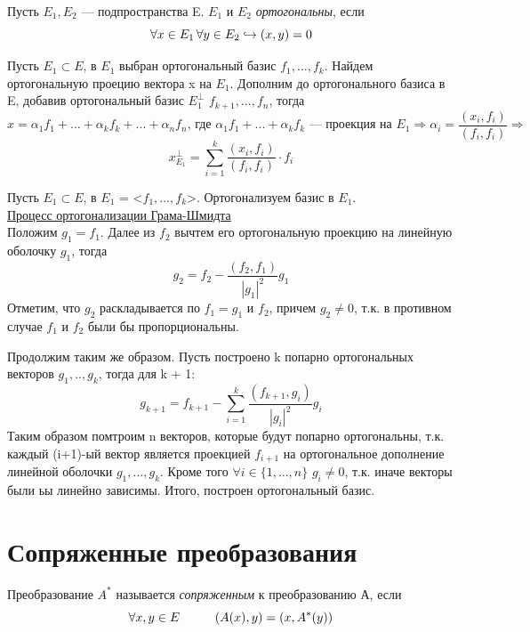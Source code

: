 \begin{definition}
    Пусть $E_1, E_2$ --- подпространства E. $E_1$ и $E_2$ \textit{ортогональны}, если 
    \[
    \forall x \in E_1\thinspace \forall y \in E_2 \hookrightarrow (x, y) = 0
    \]
\end{definition}

Пусть $E_1 \subset E$, в $E_1$ выбран ортогональный базис $f_1, ..., f_k$. Найдем ортогональную проецию вектора x на $E_1$. Дополним до ортогонального базиса в E, добавив ортогональный базис $E_1^{\perp}$ $f_{k + 1}, ..., f_n$, тогда
\[
x = \alpha_1f_1 + ... + \alpha_kf_k + ... + \alpha_nf_n \text{, где } \alpha_1f_1 + ... + \alpha_kf_k \text{ --- проекция на } E_1 \Longrightarrow \alpha_i = \dfrac{(x_i, f_i)}{(f_i, f_i)} \Longrightarrow
\]
\[
x_{E_1}^{\perp} = \sum_{i = 1}^k{\dfrac{(x_i, f_i)}{(f_i, f_i)} \cdot f_i}
\]

Пусть $E_1 \subset E$, в $E_1$ = <$f_1, ..., f_k$>. Ортогонализуем базис в $E_1$.\\

\underline{Процесс ортогонализации Грама-Шмидта}\\
Положим $g_1 = f_1$. Далее из $f_2$ вычтем его ортогональную проекцию на линейную оболочку $g_1$, тогда
\[
g_2 = f_2 - \dfrac{(f_2, f_1)}{|g_1|^2}g_1
\]
Отметим, что $g_2$ раскладывается по $f_1 = g_1$ и $f_2$, причем $g_2 \neq 0$, т.к. в противном случае $f_1$ и $f_2$ были бы пропорциональны.

Продолжим таким же образом. Пусть построено k попарно ортогональных векторов $g_1, .., g_k$, тогда для k + 1:
\[
g_{k + 1} = f_{k + 1} - \sum_{i = 1}^k{\dfrac{(f_{k + 1}, g_i)}{|g_i|^2}g_i}
\]
Таким образом помтроим n векторов, которые будут попарно ортогональны, т.к. каждый (i+1)-ый вектор является проекцией $f_{i + 1}$ на ортогональное дополнение линейной оболочки $g_1, ..., g_k$. Кроме того $\forall i \in \{1, ..., n\}$ $g_i \neq 0$, т.к. иначе векторы были ьы линейно зависимы. Итого, построен ортогональный базис.

\section{Сопряженные преобразования}

\begin{definition}
    Преобразование $A^*$ называется \textit{сопряженным} к преобразованию А, если
    \[
    \forall x, y \in E \hspace*{1cm} (A(x), y) = (x, A^*(y))
    \]
\end{definition}

